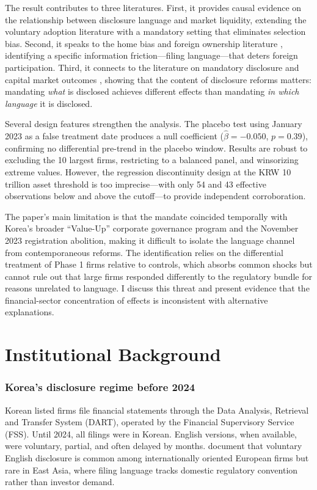 \documentclass[12pt]{article}
\begin{document}
The result contributes to three literatures. First, it provides causal evidence on the relationship between disclosure language and market liquidity, extending the voluntary adoption literature \citep{jeanjean2015, covrig2007} with a mandatory setting that eliminates selection bias. Second, it speaks to the home bias and foreign ownership literature \citep{kang1997, ahearne2004, choe2005}, identifying a specific information friction---filing language---that deters foreign participation. Third, it connects to the literature on mandatory disclosure and capital market outcomes \citep{daske2008, christensen2013, bushee2004}, showing that the content of disclosure reforms matters: mandating \emph{what} is disclosed achieves different effects than mandating \emph{in which language} it is disclosed.

Several design features strengthen the analysis. The placebo test using January 2023 as a false treatment date produces a null coefficient ($\hat{\beta} = -0.050$, $p = 0.39$), confirming no differential pre-trend in the placebo window. Results are robust to excluding the 10 largest firms, restricting to a balanced panel, and winsorizing extreme values. However, the regression discontinuity design at the KRW 10 trillion asset threshold is too imprecise---with only 54 and 43 effective observations below and above the cutoff---to provide independent corroboration.

The paper's main limitation is that the mandate coincided temporally with Korea's broader ``Value-Up'' corporate governance program and the November 2023 registration abolition, making it difficult to isolate the language channel from contemporaneous reforms. The identification relies on the differential treatment of Phase 1 firms relative to controls, which absorbs common shocks but cannot rule out that large firms responded differently to the regulatory bundle for reasons unrelated to language. I discuss this threat and present evidence that the financial-sector concentration of effects is inconsistent with alternative explanations.


\section{Institutional Background}

\subsubsection*{Korea's disclosure regime before 2024} Korean listed firms file financial statements through the Data Analysis, Retrieval and Transfer System (DART), operated by the Financial Supervisory Service (FSS). Until 2024, all filings were in Korean. English versions, when available, were voluntary, partial, and often delayed by months. \citet{jeanjean2015} document that voluntary English disclosure is common among internationally oriented European firms but rare in East Asia, where filing language tracks domestic regulatory convention rather than investor demand.
\end{document}
